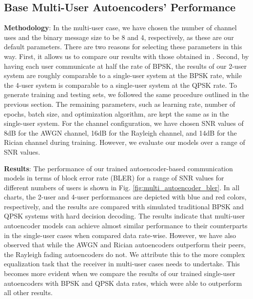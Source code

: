 \subsection{Base Multi-User Autoencoders' Performance}
\textbf{Methodology}: In the multi-user case, we have chosen the number of channel uses and the binary message size to be 8 and 4, respectively, as these are our default parameters. There are two reasons for selecting these parameters in this way. First, it allows us to compare our results with those obtained in \cite{o2017introduction}. Second, by having each user communicate at half the rate of BPSK, the results of our 2-user system are roughly comparable to a single-user system at the BPSK rate, while the 4-user system is comparable to a single-user system at the QPSK rate. To generate training and testing sets, we followed the same procedure outlined in the previous section. The remaining parameters, such as learning rate, number of epochs, batch size, and optimization algorithm, are kept the same as in the single-user system. For the channel configuration, we have chosen SNR values of 8dB for the AWGN channel, 16dB for the Rayleigh channel, and 14dB for the Rician channel during training. However, we evaluate our models over a range of SNR values.

\textbf{Results}: The performance of our trained autoencoder-based communication models in terms of block error rate (BLER) for a range of SNR values for different numbers of users is shown in Fig. \ref{fig:multi_autoencoder_bler}. In all charts, the 2-user and 4-user performances are depicted with blue and red colors, respectively, and the results are compared with simulated traditional BPSK and QPSK systems with hard decision decoding.
The results indicate that multi-user autoencoder models can achieve almost similar performance to their counterparts in the single-user cases when compared data rate-wise. However, we have also observed that while the AWGN and Rician autoencoders outperform their peers, the Rayleigh fading autoencoders do not. We attribute this to the more complex equalization task that the receiver in multi-user cases needs to undertake. This becomes more evident when we compare the results of our trained single-user autoencoders with BPSK and QPSK data rates, which were able to outperform all other results.



